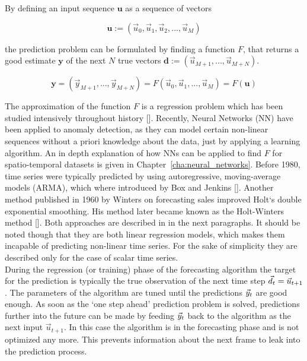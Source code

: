 By defining an input sequence $\textbf{u}$ as a sequence of vectors

\begin{equation}
  \textbf{u} := (\vec{u}_0, \vec{u}_1, \vec{u}_2, ..., \vec{u}_M)
\end{equation}

the prediction problem can be formulated by finding a function $F$, that
returns a good estimate $\textbf{y}$ of the next $N$ true vectors $\textbf{d}
:= (\vec{u}_{M+1}, ..., \vec{u}_{M+N})$.

\begin{equation}
  \textbf{y} = (\vec{y}_{M+1}, ..., \vec{y}_{M+N}) 
             = F(\vec{u}_0, \vec{u}_1, ..., \vec{u}_M)
             = F(\textbf{u})
\end{equation}

The approximation of the function $F$ is a regression problem which has
been studied intensively throughout history [\cite{narx_prediction}].
Recently, Neural Networks (NN) have been applied to anomaly detection, as they
can model certain non-linear sequences without a priori knowledge about the
data, just by applying a learning algorithm. An in depth explanation of how NNs
can be applied to find $F$ for spatio-temporal datasets is given in
Chapter~\ref{cha:neural_networks}.  Before 1980, time series were typically
predicted by using autoregressive, moving-average models (ARMA), which where
introduced by Box and Jenkins [\cite{boxjenkins}].  Another method published in
1960 by Winters on forecasting sales improved Holt`s double exponential
smoothing.  His method later became known as the Holt-Winters method
[\cite{winters1960forecasting}].  Both approaches are described in in the next
paragraphs.  It should be noted though that they are both linear regression
models, which makes them incapable of predicting non-linear time series. For
the sake of simplicity they are described only for the case of scalar time
series.\\

During the regression (or training) phase of the forecasting algorithm the
target for the prediction is typically the true observation of the next time
step $\vec{d}_t = \vec{u}_{t+1}$.  The parameters of the algorithm are tuned until
the predictions $\vec{y}_t$ are good enough.  As soon as the `one step ahead'
prediction problem is solved, predictions further into the future can be made
by feeding $\vec{y}_t$ back to the algorithm as the next input $\vec{u}_{t+1}$. In
this case the algorithm is in the forecasting phase and is not optimized
any more. This prevents information about the next frame to leak into the
prediction process.

